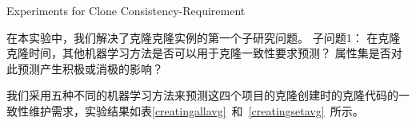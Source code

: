 {Experiments for Clone Consistency-Requirement}

在本实验中，我们解决了克隆克隆实例的第一个子研究问题。
 子问题1：
在克隆克隆时间，其他机器学习方法是否可以用于克隆一致性要求预测？
属性集是否对此预测产生积极或消极的影响？

我们采用五种不同的机器学习方法来预测这四个项目的克隆创建时的克隆代码的一致性维护需求，实验结果如表\ref{creatingallavg}~和~\ref{creatingsetavg}~所示。


